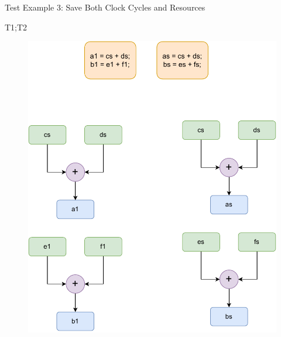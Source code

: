 \documentclass[notes, xcolor=dvipsnames]{beamer}
\begin{document}
    \begin{frame}{Test Example 3: Save Both Clock Cycles and Resources}

        T1;T2
        \begin{figure}
            \includegraphics[scale=0.4]{PartialSharedMergeClkRes.pdf}
        \end{figure}

    \end{frame}
\end{document}
